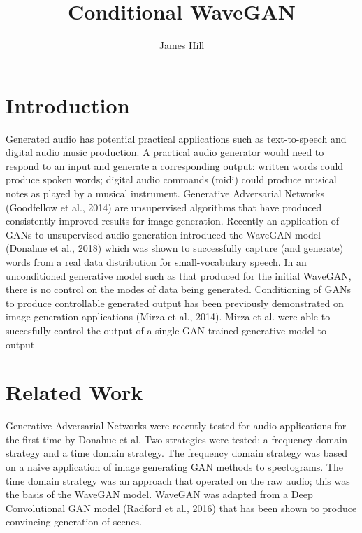 \documentclass{article}
\title{Conditional WaveGAN}
\author{James Hill}
\date{}
\begin{document}
\maketitle

\section{Introduction}

Generated audio has potential practical applications such as text-to-speech and digital audio music production.
\newline
\newline
A practical audio generator would need to respond to an input and generate a corresponding output: written words could produce spoken words; digital audio commands (midi) could produce musical notes as played by a musical instrument.
\newline
\newline
Generative Adversarial Networks (Goodfellow et al., 2014) are unsupervised algorithms that have produced consistently improved results for image generation.
\newline
\newline
Recently an application of GANs to unsupervised audio generation introduced the WaveGAN model (Donahue et al., 2018) which was shown to successfully capture (and generate) words from a real data distribution for small-vocabulary speech.
\newline
\newline
In an unconditioned generative model such as that produced for the initial WaveGAN, there is no control on the modes of data being generated.
Conditioning of GANs to produce controllable generated output has been previously demonstrated on image generation applications (Mirza et al., 2014).
Mirza et al. were able to succesfully control the output of a single GAN trained generative model to output 

\section{Related Work}

Generative Adversarial Networks were recently tested for audio applications for the first time by Donahue et al.
Two strategies were tested: a frequency domain strategy and a time domain strategy.
The frequency domain strategy was based on a naive application of image generating GAN methods to spectograms.
The time domain strategy was an approach that operated on the raw audio; this was the basis of the WaveGAN model.
\newline
\newline
WaveGAN was adapted from a Deep Convolutional GAN model (Radford et al., 2016) that has been shown to produce convincing generation of scenes.
\end{document}
